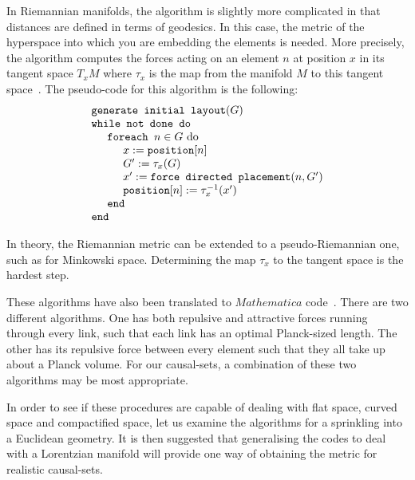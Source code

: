 \documentclass[a4paper,12pt]{article}
\numberwithin{equation}{section}
\begin{document}
In Riemannian manifolds, the algorithm is slightly more complicated in that distances are defined in terms of geodesics. In this case, the metric of the hyperspace into which you are embedding the elements is needed. More precisely, the algorithm computes the forces acting on an element $n$ at position $x$ in its tangent space $T_xM$ where $\tau_x$ is the map from the manifold $M$ to this tangent space~\cite{Kobourov2002}. The pseudo-code for this algorithm is the following:
\vspace{3mm}
\begin{equation}
\label{eq:Riemannian algorithm}
\begin{array}{l}
\texttt{generate initial layout}(G)\\
\texttt{while not done do}\\
\hspace{5mm} \texttt{foreach } n \in G \text{ do}\\
\hspace{10mm} x := \texttt{position}[n]\\
\hspace{10mm} G' := \tau_x(G)\\
\hspace{10mm} x' := \texttt{force directed placement}(n, G')\\
\hspace{10mm} \texttt{position}[n] :=\tau_x^{-1}(x')\\
\hspace{5mm} \texttt{end}\\
\texttt{end}
\end{array}
\end{equation}

In theory, the Riemannian metric can be extended to a pseudo-Riemannian one, such as for Minkowski space. Determining the map $\tau_x$ to the tangent space is the hardest step.

These algorithms have also been translated to $Mathematica$ code~\cite{Hu2005}. There are two different algorithms. One has both repulsive and attractive forces running through every link, such that each link has an optimal Planck-sized length. The other has its repulsive force between every element such that they all take up about a Planck volume. For our causal-sets, a combination of these two algorithms may be most appropriate.

In order to see if these procedures are capable of dealing with flat space, curved space and compactified space, let us examine the algorithms for a sprinkling into a Euclidean geometry. It is then suggested that generalising the codes to deal with a Lorentzian manifold will provide one way of obtaining the metric for realistic causal-sets.
\end{document}
